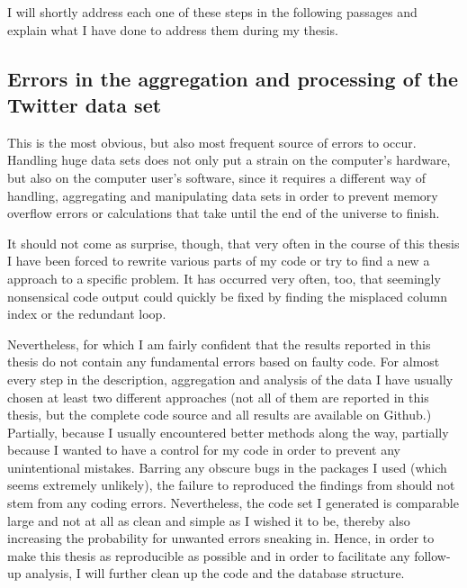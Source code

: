 \documentclass[11pt, a4paper,twoside]{report}\usepackage[]{graphicx}\usepackage[]{color}
\begin{document}
I will shortly address each one of these steps in the following passages and explain what I have done to address them during my thesis. 

\subsection{Errors in the aggregation and processing of the Twitter data set}
This is the most obvious, but also most frequent source of errors to occur. Handling huge data sets does not only put a strain on the computer's hardware, but also on the computer user's software, since it requires a different way of handling, aggregating and manipulating data sets in order to prevent memory overflow errors or calculations that take until the end of the universe to finish.

It should not come as surprise, though, that very often in the course of this thesis I have been forced to rewrite various parts of my code or try to find a new a approach to a specific problem. It has occurred very often, too, that seemingly nonsensical code output could quickly be fixed by finding the misplaced column index or the redundant loop.

Nevertheless, for which I am fairly confident that the results reported in this thesis do not contain any fundamental errors based on faulty code. For almost every step in the description, aggregation and analysis of the data I have usually chosen at least two different approaches (not all of them are reported in this thesis, but the complete code source and all results are available on Github.) Partially, because I usually encountered better methods along the way, partially because I wanted to have a control for my code in order to prevent any unintentional mistakes. Barring any obscure bugs in the packages I used (which seems extremely unlikely), the failure to reproduced the findings from \citep{bodnar_data_2015} should not stem from any coding errors. Nevertheless, the code set I generated is comparable large and not at all as clean and simple as I wished it to be, thereby also increasing the probability for unwanted errors sneaking in. Hence, in order to make this thesis as reproducible as possible and in order to facilitate any follow-up analysis, I will further clean up the code and the database structure.
\end{document}
